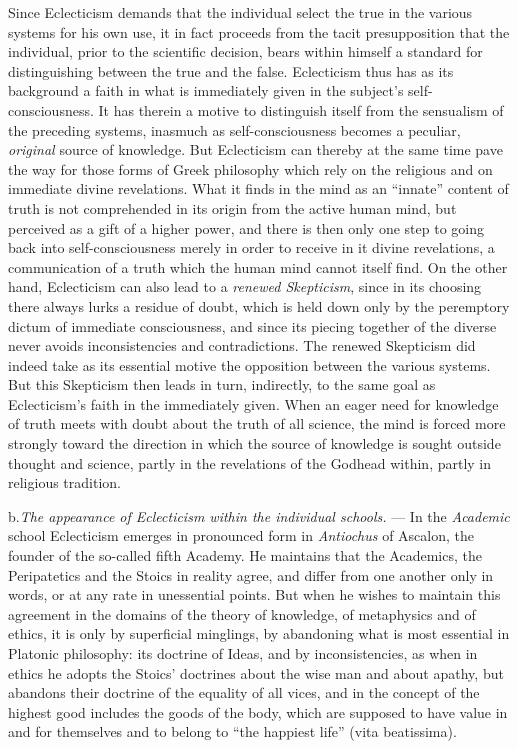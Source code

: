Since Eclecticism demands that the individual select
the true in the various systems for his own use, it
in fact proceeds from the tacit presupposition that
the individual, prior to the scientific decision, bears within himself
a standard for distinguishing between the true and the false.
Eclecticism thus has as its background a faith in what
is immediately given in the subject's self-consciousness. It has
therein a motive to distinguish itself from the sensualism of the preceding systems, inasmuch as self-consciousness becomes a peculiar, \emph{original} source of knowledge. But Eclecticism can
thereby at the same time pave the way for those forms of Greek
philosophy which rely on the religious and on immediate divine revelations. What it finds in
the mind as an ``innate'' content of truth is not
comprehended in its origin from the active human mind,
but perceived as a gift of a higher power, and there is then
only one step to going back into self-consciousness merely in order
to receive in it divine revelations, a communication
of a truth which the human mind cannot itself find. On the
other hand, Eclecticism can also lead to a \emph{renewed
Skepticism}, since in its choosing there always lurks a residue of
doubt, which is held down only by the peremptory dictum of immediate
consciousness, and since its piecing together of the diverse
never avoids inconsistencies and contradictions. The renewed
Skepticism did indeed take as its essential motive the opposition
between the various systems. But this Skepticism then leads
in turn, indirectly, to the same goal as Eclecticism's faith
in the immediately given. When an eager need for knowledge of truth meets with doubt about the truth of all science,
the mind is forced more strongly toward the direction in which the source of knowledge is sought outside thought and science, partly in
the revelations of the Godhead within, partly in religious
tradition.

\divrule

b.\enspace \emph{The appearance of Eclecticism within the individual schools.} --- In the \emph{Academic} school Eclecticism emerges in pronounced form in \emph{Antiochus} of Ascalon,
the founder of the so-called fifth Academy. He maintains that
the Academics, the Peripatetics and the Stoics in reality
agree, and differ from one another only in words, or
at any rate in unessential points. But when he wishes to maintain this
agreement in the domains of the theory of knowledge, of metaphysics and of ethics, it is only by superficial minglings, by abandoning what is most essential in Platonic
philosophy: its doctrine of Ideas, and by inconsistencies, as when
in ethics he adopts the Stoics' doctrines about the wise man
and about apathy, but abandons their doctrine of the equality of all vices,
and in the concept of the highest good includes
the goods of the body, which are supposed to have value in and for themselves and to belong
to ``the happiest life'' (vita beatissima).


